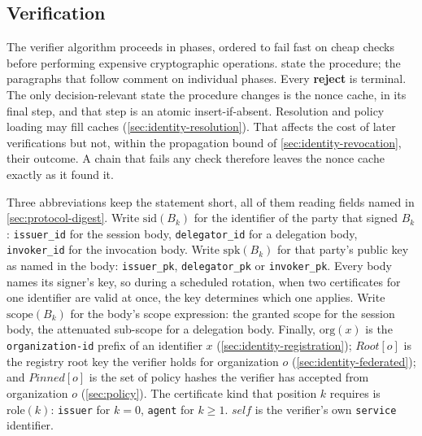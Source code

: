 \documentclass[11pt,a4paper]{article}
\begin{document}
\subsection{Verification}
\label{sec:protocol-verification}

The verifier algorithm proceeds in phases, ordered to fail fast on
cheap checks before performing expensive cryptographic operations.
 state the procedure; the paragraphs that
follow comment on individual phases. Every \textbf{reject} is terminal.
The only decision-relevant state the procedure changes is the nonce
cache, in its final step, and that step is an atomic insert-if-absent.
Resolution and policy loading may fill caches
(\cref{sec:identity-resolution}). That affects the cost of later
verifications but not, within the propagation bound of
\cref{sec:identity-revocation}, their outcome. A chain that fails any
check therefore leaves the nonce cache exactly as it found it.

Three abbreviations keep the statement short, all of them reading fields
named in \cref{sec:protocol-digest}. Write $\mathrm{sid}(B_k)$ for the
identifier of the party that signed $B_k$: \texttt{issuer\_id} for the
session body, \texttt{delegator\_id} for a delegation body,
\texttt{invoker\_id} for the invocation body. Write $\mathrm{spk}(B_k)$
for that party's public key as named in the body: \texttt{issuer\_pk},
\texttt{delegator\_pk} or \texttt{invoker\_pk}. Every body names its
signer's key, so during a scheduled rotation, when two certificates for
one identifier are valid at once, the key determines which one applies. Write $\mathrm{scope}(B_k)$ for the
body's scope expression: the granted scope for the session body, the
attenuated sub-scope for a delegation body. Finally, $\mathrm{org}(x)$ is
the \texttt{organization-id} prefix of an identifier $x$
(\cref{sec:identity-registration}); $\mathit{Root}[o]$ is the registry
root key the verifier holds for organization $o$
(\cref{sec:identity-federated}); and $\mathit{Pinned}[o]$ is the set
of policy hashes the verifier has accepted from organization $o$
(\cref{sec:policy}). The certificate kind that position $k$ requires is
$\mathrm{role}(k)$: \texttt{issuer} for $k = 0$, \texttt{agent} for
$k \ge 1$. $\mathit{self}$ is the verifier's own \texttt{service}
identifier.
\end{document}
